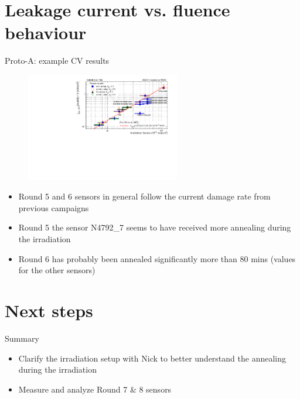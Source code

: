 \documentclass{beamer}
\begin{document}
\section{Leakage current vs. fluence behaviour}
\begin{frame}{Proto-A: example CV results}
  \begin{figure}
      \includegraphics[width=0.6\textwidth]{plots/alpha_600V.pdf}    
  \end{figure}
  \begin{itemize}
    \item Round 5 and 6 sensors in general follow the current damage rate from previous campaigns
    \item Round 5 the sensor N4792\_7 seems to have received more annealing during the irradiation
    \item Round 6 has probably been annealed significantly more than 80 mins (values for the other sensors)
  \end{itemize}
\end{frame}


\section{Next steps}
\begin{frame}{Summary}
  \begin{itemize}
    \item Clarify the irradiation setup with Nick to better understand the annealing during the irradiation
    \item Measure and analyze Round 7 \& 8 sensors
  \end{itemize}
\end{frame}

\appendix
\end{document}
